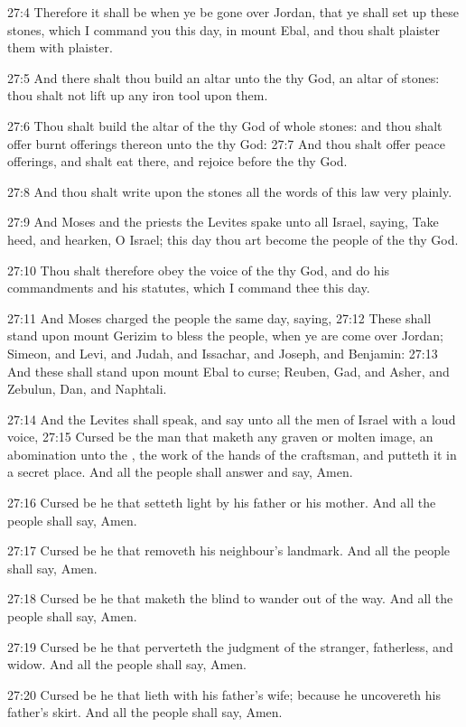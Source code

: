27:4 Therefore it shall be when ye be gone over Jordan, that ye shall set up these stones, which I command you this day, in mount Ebal, and thou shalt plaister them with plaister.

27:5 And there shalt thou build an altar unto the \LORD thy God, an altar of stones: thou shalt not lift up any iron tool upon them.

27:6 Thou shalt build the altar of the \LORD thy God of whole stones: and thou shalt offer burnt offerings thereon unto the \LORD thy God: 27:7 And thou shalt offer peace offerings, and shalt eat there, and rejoice before the \LORD thy God.

27:8 And thou shalt write upon the stones all the words of this law very plainly.

27:9 And Moses and the priests the Levites spake unto all Israel, saying, Take heed, and hearken, O Israel; this day thou art become the people of the \LORD thy God.

27:10 Thou shalt therefore obey the voice of the \LORD thy God, and do his commandments and his statutes, which I command thee this day.

27:11 And Moses charged the people the same day, saying, 27:12 These shall stand upon mount Gerizim to bless the people, when ye are come over Jordan; Simeon, and Levi, and Judah, and Issachar, and Joseph, and Benjamin: 27:13 And these shall stand upon mount Ebal to curse; Reuben, Gad, and Asher, and Zebulun, Dan, and Naphtali.

27:14 And the Levites shall speak, and say unto all the men of Israel with a loud voice, 27:15 Cursed be the man that maketh any graven or molten image, an abomination unto the \LORD, the work of the hands of the craftsman, and putteth it in a secret place. And all the people shall answer and say, Amen.

27:16 Cursed be he that setteth light by his father or his mother. And all the people shall say, Amen.

27:17 Cursed be he that removeth his neighbour's landmark. And all the people shall say, Amen.

27:18 Cursed be he that maketh the blind to wander out of the way. And all the people shall say, Amen.

27:19 Cursed be he that perverteth the judgment of the stranger, fatherless, and widow. And all the people shall say, Amen.

27:20 Cursed be he that lieth with his father's wife; because he uncovereth his father's skirt. And all the people shall say, Amen.

